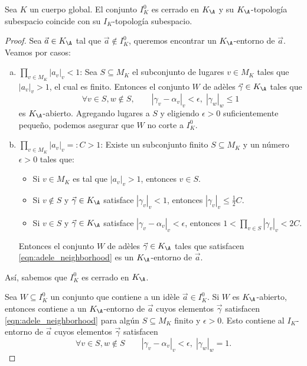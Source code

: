 \documentclass[teoria-numeros.tex]{subfiles}
\begin{document}
\begin{slem}
	Sea $K$ un cuerpo global.
	El conjunto $I_K^0$ es cerrado en $K_\A$ y su $K_\A$-topología subespacio coincide con su $I_K$-topología subespacio.
\end{slem}
\begin{proof}
	Sea $\vec a \in K_\A$ tal que $\vec a \notin I_K^0$, queremos encontrar un $K_\A$-entorno de $\vec a$.
	Veamos por casos:
	\begin{enumerate}[(a)]
		\item $\prod_{v\in M_K} |a_v|_v < 1$:
			Sea $S \subseteq M_K$ el subconjunto de lugares $v \in M_K$ tales que $|a_v|_v > 1$, el cual es finito.
			Entonces el conjunto $W$ de adèles $\vec\gamma \in K_\A$ tales que
			\begin{equation}
				\forall v \in S, w \notin S, \qquad |\gamma_v - \alpha_v|_v < \epsilon, \; |\gamma_w|_w \le 1
				\label{eqn:adele_neighborhood}
			\end{equation}
			es $K_\A$-abierto.
			Agregando lugares a $S$ y eligiendo $\epsilon > 0$ suficientemente pequeño, podemos asegurar que $W$ no corte a $I_K^0$.

		\item $\prod_{v\in M_K} |a_v|_v =: C > 1$:\footnotemark{}
			Existe un subconjunto finito $S \subseteq M_K$ y un número $\epsilon > 0$ tales que:
			\begin{itemize}
				\item Si $v \in M_K$ es tal que $|a_v|_v > 1$, entonces $v \in S$.
				\item Si $v \notin S$ y $\vec\gamma \in K_\A$ satisface $|\gamma_v|_v < 1$, entonces $|\gamma_v|_v \le \frac{1}{2}C$.
				\item Si $v \in S$ y $\vec\gamma \in K_\A$ satisface $|\gamma_v - \alpha_v|_v < \epsilon$,
					entonces $1 < \prod_{v\in S} |\gamma_v|_v < 2C$.
			\end{itemize}
			Entonces el conjunto $W$ de adèles $\vec\gamma \in K_\A$ tales que satisfacen \eqref{eqn:adele_neighborhood}
			es un $K_\A$-entorno de $\vec a$.
	\end{enumerate}
	Así, sabemos que $I_K^0$ es cerrado en $K_\A$.

	Sea $W \subseteq I_K^0$ un conjunto que contiene a un idèle $\vec a \in I_K^0$.
	Si $W$ es $K_\A$-abierto, entonces contiene a un $K_\A$-entorno de $\vec a$ cuyos elementos $\vec\gamma$ satisfacen \eqref{eqn:adele_neighborhood}
	para algún $S \subseteq M_K$ finito y $\epsilon > 0$.
	Esto contiene al $I_K$-entorno de $\vec a$ cuyos elementos $\vec\gamma$ satisfacen
	\begin{equation}
		\forall v \in S, w \notin S \qquad |\gamma_v - \alpha_v|_v < \epsilon, \; |\gamma_w|_w = 1.
		\label{eqn:idele_neighborhood}
	\end{equation}


\end{proof}
\end{document}
